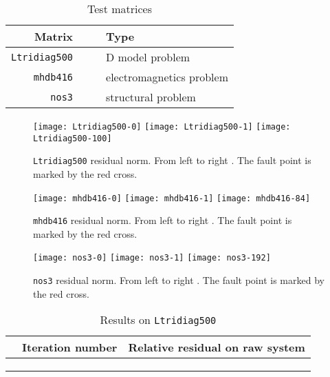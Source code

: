\documentclass[11pt]{article}
\begin{document}
\begin{table}[tb]
\caption{Test matrices}
\label{table:test-matrix}
\begin{center}
\begin{tabularx}{0.7\linewidth}{rXXl}
\toprule
  Matrix &  &  & Type \\
\midrule
  {\tt Ltridiag500} &  &  & D model problem \\
  {\tt mhdb416} &  &  & electromagnetics problem\\
  {\tt nos3} &  &  & structural problem \\
\bottomrule
 \end{tabularx}
\end{center}

\end{table}

\begin{figure}[t]
  \centering 
  \texttt{[image: Ltridiag500-0]}
  \texttt{[image: Ltridiag500-1]}
  \texttt{[image: Ltridiag500-100]}
  \caption{{{\tt Ltridiag500} residual norm. From left to right . The fault point is marked by the red cross.}}
  \label{figure:residual-norm-Ltridiag500}
  \vspace{\baselineskip}
  
  \texttt{[image: mhdb416-0]}
  \texttt{[image: mhdb416-1]}
  \texttt{[image: mhdb416-84]}
  \caption{{{\tt mhdb416} residual norm. From left to right . The fault point is marked by the red cross.}}
  \label{figure:residual-norm-mhdb416}
\vspace{\baselineskip}

  \texttt{[image: nos3-0]}
  \texttt{[image: nos3-1]}
  \texttt{[image: nos3-192]}
  \caption{{{\tt nos3} residual norm. From left to right . The fault point is marked by the red cross.}}
  \label{figure:residual-norm-nos3}
\end{figure}

\begin{table}[t]
\caption{{Results on {\tt Ltridiag500}}}
\begin{center}
\begin{tabular}{lll}
  \toprule
   & Iteration number & Relative residual on raw system\\
  \midrule
   &  &  \\
   &  &  \\
   &  & \\
  \bottomrule
 \end{tabular}
\end{center}
\label{table:Ltridiag500}
\end{table}
\end{document}

